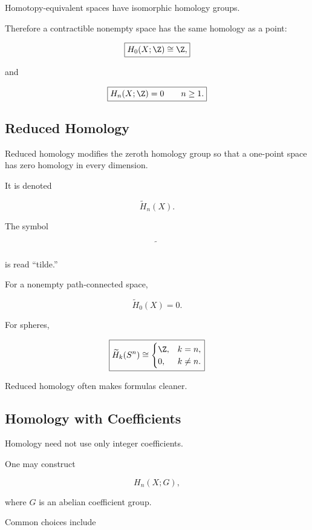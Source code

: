 Homotopy-equivalent spaces have isomorphic homology groups.

Therefore a contractible nonempty space has the same homology as a point:

\[
\boxed{
H_0(X;\Z)\cong\Z,
}
\]

and

\[
\boxed{
H_n(X;\Z)=0
\qquad
n\geq1.
}
\]

\subsection{Reduced Homology}
\label{subsec:reduced-homology}

Reduced homology modifies the zeroth homology group so that a one-point
space has zero homology in every dimension.

It is denoted

\[
\boxed{
\widetilde{H}_n(X).
}
\]

The symbol

\[
\widetilde{\phantom{H}}
\]

is read ``tilde.''

For a nonempty path-connected space,

\[
\boxed{
\widetilde{H}_0(X)=0.
}
\]

For spheres,

\[
\boxed{
\widetilde{H}_k(S^n)
\cong
\begin{cases}
\Z,
&
k=n,
\\
0,
&
k\neq n.
\end{cases}
}
\]

Reduced homology often makes formulas cleaner.

\subsection{Homology with Coefficients}
\label{subsec:homology-coefficients}

Homology need not use only integer coefficients.

One may construct

\[
\boxed{
H_n(X;G),
}
\]

where \(G\) is an abelian coefficient group.

Common choices include

